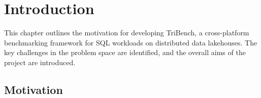\documentclass{l4proj}
\begin{document}
\tableofcontents

%
%
%

%
%
%
%
\chapter{Introduction}
\label{chap:intro}


This chapter outlines the motivation for developing TriBench, a cross-platform benchmarking framework for SQL workloads on distributed data lakehouses. The key challenges in the problem space are identified, and the overall aims of the project are introduced.

\section{Motivation}
\label{sec:motivation}
\end{document}
